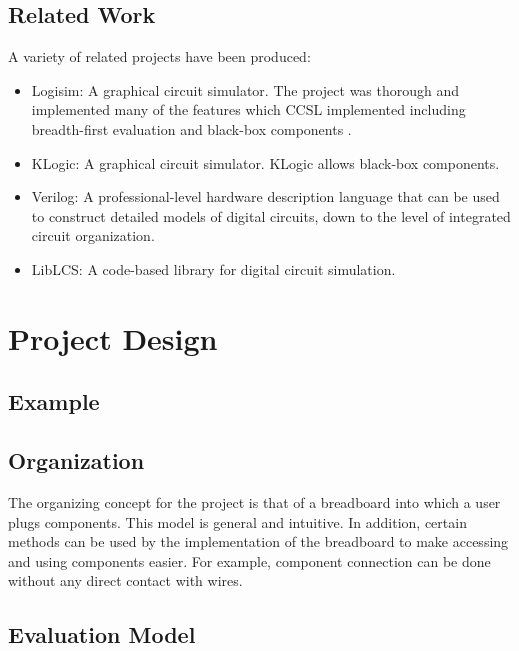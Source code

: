 \documentclass{article}
\begin{document}
\subsection{Related Work}

A variety of related projects have been produced:

\begin{itemize}

\item Logisim: A graphical circuit simulator. The project was thorough and implemented many of the features which CCSL implemented including breadth-first evaluation and black-box components  \cite{Burch-2002}.

\item KLogic: A graphical circuit simulator. KLogic allows black-box components. \cite{Rostin-2001}

\item Verilog: A professional-level hardware description language that can be used to construct detailed models of digital circuits, down to the level of integrated circuit organization.  \cite{IEEE-2006}

\item LibLCS: A code-based library for digital circuit simulation.

\cite{Chandra-2007}

\end{itemize}

\section{Project Design}

\subsection{Example}



\subsection{Organization}

The organizing concept for the project is that of a breadboard into which a user plugs components. This model is general and intuitive. In addition, certain methods can be used by the implementation of the breadboard to make accessing and using components easier. For example, component connection can be done without any direct contact with wires.

\subsection{Evaluation Model}
\end{document}
